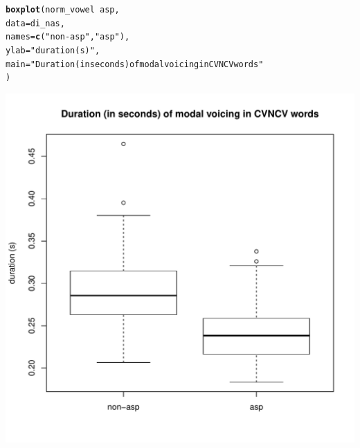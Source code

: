 \documentclass[a4paper,11pt]{article}\usepackage[]{graphicx}\usepackage[]{color}
\makeatletter
\def\maxwidth{ %
  \ifdim\Gin@nat@width>\linewidth
    \linewidth
  \else
    \Gin@nat@width
  \fi
}
\newcommand{\hlstr}[1]{\textcolor[rgb]{0.192,0.494,0.8}{#1}}%
\newcommand{\hlopt}[1]{\textcolor[rgb]{0,0,0}{#1}}%
\newcommand{\hlstd}[1]{\textcolor[rgb]{0.345,0.345,0.345}{#1}}%
\newcommand{\hlkwc}[1]{\textcolor[rgb]{0.333,0.667,0.333}{#1}}%
\newcommand{\hlkwd}[1]{\textcolor[rgb]{0.737,0.353,0.396}{\textbf{#1}}}%
\newenvironment{kframe}{%
 \def\at@end@of@kframe{}%
 \ifinner\ifhmode%
  \def\at@end@of@kframe{\end{minipage}}%
  \begin{minipage}{\columnwidth}%
 \fi\fi%
 \def\FrameCommand##1{\hskip\@totalleftmargin \hskip-\fboxsep
 \colorbox{shadecolor}{##1}\hskip-\fboxsep
     \hskip-\linewidth \hskip-\@totalleftmargin \hskip\columnwidth}%
 \MakeFramed {\advance\hsize-\width
   \@totalleftmargin\z@ \linewidth\hsize
   \@setminipage}}%
 {\par\unskip\endMakeFramed%
 \at@end@of@kframe}
\newenvironment{knitrout}{}{} %
\makeatother
\begin{document}
\begin{knitrout}
\color{fgcolor}\begin{kframe}
\begin{alltt}
\hlkwd{boxplot}\hlstd{(norm_vowel} \hlopt{~} \hlstd{asp,}
        \hlkwc{data} \hlstd{= di_nas,}
        \hlkwc{names} \hlstd{=} \hlkwd{c}\hlstd{(}\hlstr{"non-asp"}\hlstd{,} \hlstr{"asp"}\hlstd{),}
        \hlkwc{ylab} \hlstd{=} \hlstr{"duration (s)"}\hlstd{,}
        \hlkwc{main} \hlstd{=} \hlstr{"Duration (in seconds) of modal voicing in CVNCV words"}
        \hlstd{)}
\end{alltt}
\end{kframe}
\includegraphics[width=\maxwidth]{img/bi-nas-box-1} 

\end{knitrout}
\end{document}
